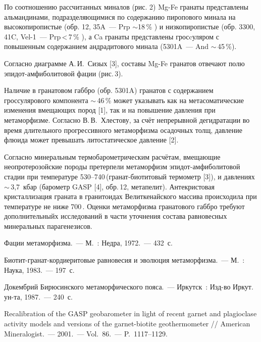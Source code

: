 

По соотношению рассчитанных миналов (рис. 2) Mg-Fe гранаты представлены альмандинами, подразделяющимися по содержанию пиропового минала на высокопиропистые (обр. 12, 35A~--- Prp $\sim$18\,\%  ) и низкопиропистые (обр. 3300, 41C, Vel-1~--- Prp\,<\,7\,\% ), а Ca гранаты представлены гросcуляром с повышенным содержанием андрадитового минала (5301A~--- And $\sim$\,45\,\%).

Согласно диаграмме А.\,И.~Сизых [3], составы Mg-Fe гранатов отвечают полю эпидот-амфиболитовой фации (рис.\,3).



Наличие в гранатовом габбро (обр. 5301A) гранатов с содержанием гроссулярового компонента $\sim$\,46\,\%  может указывать как на метасоматические изменения  вмещающих пород [1], так и на повышение давления при метаморфизме.  Согласно В.\,В.~Хлестову, за счёт  непрерывной  дегидратации во время длительного прогрессивного метаморфизма осадочных толщ, давление флюида  может превышать литостатическое давление [2].

Согласно минеральным термобарометрическим расчётам,  вмещающие неопротерозойские породы претерпели метаморфизм эпидот-амфиболитовой стадии при температуре 530--740\,\dgc (гранат-биотитовый термометр [3]), и давлениях $\sim$\,3,7~кбар  (барометр GASP [4], обр.\,12, метапелит). Антекристовая кристаллизация граната в гранитоидах Велиткенайского массива происходила при температуре не ниже 700\,\dgc. Оценки метаморфизма гранатового габбро требуют дополнительныйх исследований в части уточнения состава равновесных минеральных парагенезисов.
\clearpage
\begin{thebibliography}{99}

\bibitem{} Фации метаморфизма.~--- М.~: Недра, 1972.~--- 432~с.

\bibitem{} Биотит-гранат-кордиеритовые равновесия и эволюция метаморфизма.~--- М.~: Наука, 1983.~--- 197~с.

\bibitem{} Докембрий Бирюсинского метаморфического пояса.~--- Иркутск~: Изд-во Иркут. ун-та, 1987.~--- 240~с.


\bibitem{} Recalibration of the GASP geobarometer in light of recent garnet and plagioclase activity models and versions of the garnet-biotite geothermometer // American Mineralogist.~--- 2001.~--- Vol.~86.~--- P.~1117--1129.
\end{thebibliography}
\thispagestyle{empty}
